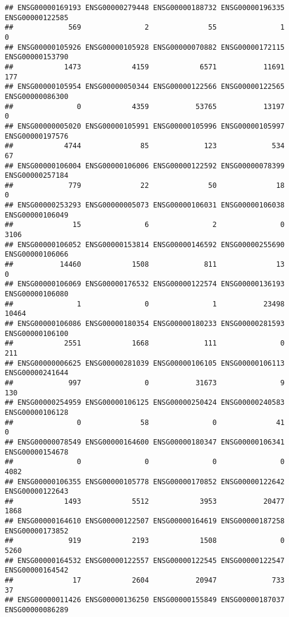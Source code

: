 \documentclass[
]{article}
\begin{document}
\begin{verbatim}
## ENSG00000169193 ENSG00000279448 ENSG00000188732 ENSG00000196335 ENSG00000122585 
##             569               2              55               1               0 
## ENSG00000105926 ENSG00000105928 ENSG00000070882 ENSG00000172115 ENSG00000153790 
##            1473            4159            6571           11691             177 
## ENSG00000105954 ENSG00000050344 ENSG00000122566 ENSG00000122565 ENSG00000086300 
##               0            4359           53765           13197               0 
## ENSG00000005020 ENSG00000105991 ENSG00000105996 ENSG00000105997 ENSG00000197576 
##            4744              85             123             534              67 
## ENSG00000106004 ENSG00000106006 ENSG00000122592 ENSG00000078399 ENSG00000257184 
##             779              22              50              18               0 
## ENSG00000253293 ENSG00000005073 ENSG00000106031 ENSG00000106038 ENSG00000106049 
##              15               6               2               0            3106 
## ENSG00000106052 ENSG00000153814 ENSG00000146592 ENSG00000255690 ENSG00000106066 
##           14460            1508             811              13               0 
## ENSG00000106069 ENSG00000176532 ENSG00000122574 ENSG00000136193 ENSG00000106080 
##               1               0               1           23498           10464 
## ENSG00000106086 ENSG00000180354 ENSG00000180233 ENSG00000281593 ENSG00000106100 
##            2551            1668             111               0             211 
## ENSG00000006625 ENSG00000281039 ENSG00000106105 ENSG00000106113 ENSG00000241644 
##             997               0           31673               9             130 
## ENSG00000254959 ENSG00000106125 ENSG00000250424 ENSG00000240583 ENSG00000106128 
##               0              58               0              41               0 
## ENSG00000078549 ENSG00000164600 ENSG00000180347 ENSG00000106341 ENSG00000154678 
##               0               0               0               0            4082 
## ENSG00000106355 ENSG00000105778 ENSG00000170852 ENSG00000122642 ENSG00000122643 
##            1493            5512            3953           20477            1868 
## ENSG00000164610 ENSG00000122507 ENSG00000164619 ENSG00000187258 ENSG00000173852 
##             919            2193            1508               0            5260 
## ENSG00000164532 ENSG00000122557 ENSG00000122545 ENSG00000122547 ENSG00000164542 
##              17            2604           20947             733              37 
## ENSG00000011426 ENSG00000136250 ENSG00000155849 ENSG00000187037 ENSG00000086289 

\end{verbatim}
\end{document}
